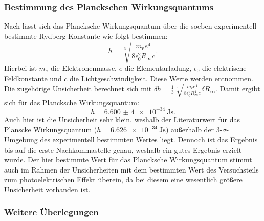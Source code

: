 \subsubsection{Bestimmung des Planckschen Wirkungsquantums}
Nach \cite{balmer_handblatt} lässt sich das Plancksche Wirkungsquantum über die soeben experimentell bestimmte Rydberg-Konstante wie folgt bestimmen:
\begin{equation*}
    h = \sqrt[3]{\frac{m_{\mathrm{e}}e^4}{8 \epsilon_0^2 R_{\infty} c}} .
\end{equation*} Hierbei ist $m_e$ die Elektronenmasse, $e$ die Elementarladung, $\epsilon_0$ die elektrische Feldkonstante und $c$ die Lichtgeschwindigkeit.
Diese Werte werden \cite{Demtröder:829119} entnommen. Die zugehörige Unsicherheit berechnet sich mit $\delta h = \frac{1}{3} \sqrt[3]{\frac{m_e e^4}{8 \epsilon_0^2 R_{\infty}^4 c}} \delta R_{\infty}$.
Damit ergibt sich für das Plancksche Wirkungsquantum:
\begin{equation*}
    h = \SI{6,600(4)e-34}{\joule \second} .
\end{equation*} Auch hier ist die Unsicherheit sehr klein, weshalb der Literaturwert für das Planscke Wirkungsquantum ($h = \SI{6,626e-34}{\joule \second}$)
außerhalb der 3-$\sigma$-Umgebung des experimentell bestimmten Wertes liegt. Dennoch ist das Ergebnis bis auf die erste Nachkommastelle genau,
weshalb ein gutes Ergebnis erzielt wurde. Der hier bestimmte Wert für das Plancksche Wirkungsquantum stimmt auch im Rahmen der Unsicherheiten
mit dem bestimmten Wert des Versuchsteils zum photoelektrischen Effekt überein, da bei diesem eine wesentlich größere Unsicherheit vorhanden ist.

\subsubsection{Weitere Überlegungen}

